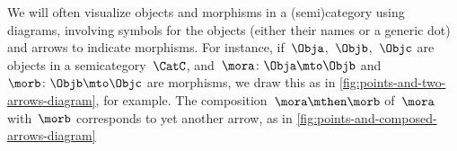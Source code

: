 \begin{marginfigure}
    \begin{center}
    \end{center}
    \caption{}
    \label{fig:points-and-two-arrows-diagram}
\end{marginfigure}

\begin{marginfigure}
    \begin{center}
    \end{center}
    \caption{}
    \label{fig:points-and-composed-arrows-diagram}
\end{marginfigure}

We will often visualize objects and morphisms in a (semi)category using diagrams, involving symbols for the objects (either their names or a generic dot) and arrows to indicate morphisms.
For instance, if~$\Obja$,~$\Objb$,~$\Objc$ are objects in a semicategory~$\CatC$, and~$\mora\colon \Obja \mto \Objb$ and~$\morb\colon \Objb \mto \Objc$ are morphisms, we draw this as in \cref{fig:points-and-two-arrows-diagram}, for example.
The composition~$\mora \mthen \morb$ of~$\mora$ with~$\morb$ corresponds to yet another arrow, as in \cref{fig:points-and-composed-arrows-diagram}

